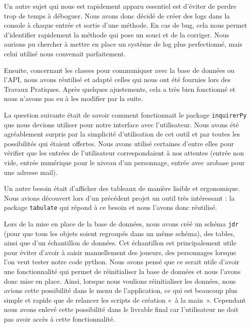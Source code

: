 \documentclass[11pt]{article}
\begin{document}
\bigbreak

Un autre sujet qui nous est rapidement apparu essentiel est d'éviter de perdre trop de temps à déboguer. Nous avons donc décidé de créer des logs dans la console à chaque entrée et sortie d'une méthode. En cas de bug, cela nous permet d'identifier rapidement la méthode qui pose un souci et de la corriger. Nous aurions pu chercher à mettre en place un système de log plus perfectionné, mais celui utilisé nous convenait parfaitement.

\bigbreak

Ensuite, concernant les classes pour communiquer avec la base de données ou l'API, nous avons réutilisé et adapté celles qui nous ont été fournies lors des Travaux Pratiques. Après quelques ajustements, cela a très bien fonctionné et nous n'avons pas eu à les modifier par la suite.

\bigbreak

La question suivante était de savoir comment fonctionnait le package \texttt{inquirerPy} que nous devions utiliser pour notre interface avec l'utilisateur. Nous avons été agréablement surpris par la simplicité d'utilisation de cet outil et par toutes les possibilités qui étaient offertes. Nous avons utilisé certaines d'entre elles pour vérifier que les entrées de l'utilisateur correspondaient à nos attentes (entrée non vide, entrée numérique pour le niveau d'un personnage, entrée avec arobase pour une adresse mail).

\bigbreak

Un autre besoin était d'afficher des tableaux de manière lisible et ergonomique. Nous avions découvert lors d'un précédent projet un outil très intéressant : la package \texttt{tabulate} qui répond à ce besoin et nous l'avons donc réutilisé.

\bigbreak

Lors de la mise en place de la base de données, nous avons créé un schéma \texttt{jdr} (pour que tous les objets soient regroupés dans un même schéma), des tables, ainsi que d'un échantillon de données. Cet échantillon est principalement utile pour éviter d'avoir à saisir manuellement des joueurs, des personnages lorsque l'on veut tester notre code python. Nous avons pensé que ce serait utile d'avoir une fonctionnalité qui permet de réinitialiser la base de données et nous l'avons donc mise en place. 
Ainsi, lorsque nous voulions réinitialiser les données, nous avions cette possibilité dans le menu de l'application, ce qui est beaucoup plus simple et rapide que de relancer les scripts de création «~à la main~». Cependant nous avons enlevé cette possibilité dans le livrable final car l'utilisateur ne doit pas avoir accès à cette fonctionnalité.
\end{document}
